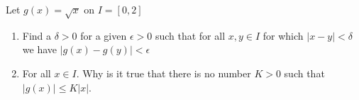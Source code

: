 \documentclass[boxes, qed]{homework}
\begin{document}
\begin{problem}Let $g(x)=\sqrt{x}$ on $I = [0, 2]$
\end{problem}
\begin{solution}
  \begin{enumerate}
    \item Find a $\delta>0$ for a given $\epsilon>0$ such that for all $x,y \in I$ 
    for which $|x−y|<\delta$
    we have $|g(x) − g(y)| < \epsilon$
    \item For all $x \in I$. Why is it true that there is no number $K > 0$ such that $|g(x)| \le K|x|$.
  \end{enumerate}
\end{solution}
\end{document}
